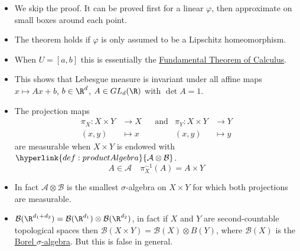 \documentclass{article}
\newcommand{\1}[1]{\mathbbm{1}_{#1}}
\begin{document}
\begin{remark}\leavevmode
    \begin{itemize}
        \item We skip the proof. It can be proved first for a linear $\varphi$, then approximate on small boxes around each point.

        \item The theorem holds if $\varphi$ is only assumed to be a Lipschitz homeomorphism.

        \item When $U = [a, b]$ this is essentially the \hyperlink{thm:ftoc}{Fundamental Theorem of Calculus}.

        \item This shows that Lebesgue measure is invariant under all affine maps $x \mapsto Ax + b$, $b \in \R^d$, $A \in GL_d(\R)$ with $\det A = 1$.
    \end{itemize}
\end{remark}


\begin{remark}\leavevmode
    \begin{itemize}
        \item The projection maps
            \begin{align*}
                \pi_X: X \times Y &\longrightarrow X & &\text{and} & \pi_Y: X \times Y &\longrightarrow Y \\
                (x, y) &\longmapsto x &&& (x, y) &\longmapsto y
            \end{align*}
            are measurable when $X \times Y$ is endowed with $\hyperlink{def:productAlgebra}{\mathcal{A} \otimes \mathcal{B}}$.
            \begin{equation*}A \in \mathcal{A} \quad \pi_X^{-1} (A) = A \times Y
            \end{equation*}
        \item In fact $\mathcal{A} \otimes \mathcal{B}$ is the smallest $\sigma$-algebra on $X \times Y$ for which both projections are measurable.
        \item $\mathcal{B}(\R^{d_1 + d_2}) = \mathcal{B}(\R^{d_1}) \otimes \mathcal{B}(\R^{d_2})$, in fact if $X$ and $Y$ are second-countable topological spaces then $\mathcal{B}(X \times Y) = \mathcal{B}(X) \otimes B(Y)$, where $\mathcal{B}(X)$ is the \hyperlink{def:borelAlg}{Borel $\sigma$-algebra}.
            But this is false in general.
    \end{itemize}
\end{remark}
\end{document}
